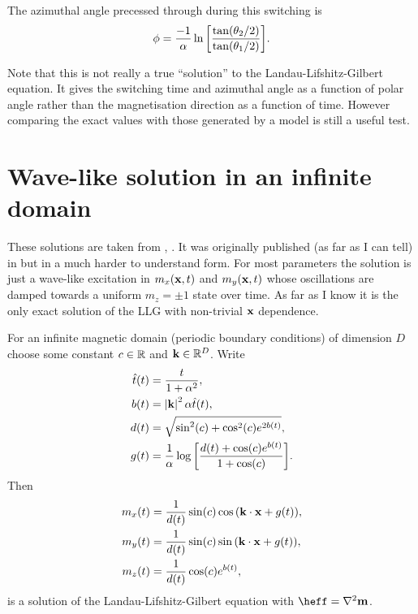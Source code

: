 The azimuthal angle precessed through during this switching is
\begin{equation}
  \phi = \frac{-1}{\alpha} \ln {\left[  \frac{\tan(\theta_2/2)}{\tan(\theta_1/2)}  \right]}.
\end{equation}

Note that this is not really a true ``solution'' to the Landau-Lifshitz-Gilbert equation.
It gives the switching time and azimuthal angle as a function of polar angle rather than the magnetisation direction as a function of time. However comparing the exact values with those generated by a model is still a useful test.


\section{Wave-like solution in an infinite domain}
\label{sec:wave-like-solution}

These solutions are taken from \cite{Jeong2014}, \cite{Fuwa2006}. It was originally published (as far as I can tell) in \cite{Lakshmanan1976} but in a much harder to understand form.
For most parameters the solution is just a wave-like excitation in $m_x(\mathbf{x}, t)$ and $m_y(\mathbf{x}, t)$ whose oscillations are damped towards a uniform $m_z = \pm 1$ state over time.
As far as I know it is the only exact solution of the LLG with non-trivial $\mathbf{x}$ dependence.

For an infinite magnetic domain (\ie periodic boundary conditions) of dimension $D$ choose some constant $c \in \mathbb{R}$ and $\mathbf{k} \in \mathbb{R}^D$.
Write
\begin{equation}
  \begin{aligned}
    \hat{t}(t) &= \frac{t}{1 + \alpha^2}, \\
    b(t) &= \left|{\mathbf{k}} \right|^2 \alpha \hat{t}(t), \\
    d(t) &= \sqrt{\sin^2(c) + \cos^2(c)e^{2 b(t)}}, \\
    g(t) &= \frac{1}{\alpha} \log {\left[  \frac{d(t) + \cos(c) e^{b(t)}}{1 + \cos(c)}  \right]}.
  \end{aligned}
\end{equation}
Then
\begin{equation}
  \begin{aligned}
    m_x(t) &= \frac{1}{d(t)} \sin(c) \cos{\left( \mathbf{k}\cdot \mathbf{x}+ g(t)  \right)}, \\
    m_y(t) &= \frac{1}{d(t)} \sin(c) \sin{\left( \mathbf{k}\cdot \mathbf{x}+ g(t)  \right)}, \\
    m_z(t) &= \frac{1}{d(t)} \cos(c) e^{b(t)},
  \end{aligned}
\end{equation}
is a solution of the Landau-Lifshitz-Gilbert equation with $\heff = \lap \mv$.

